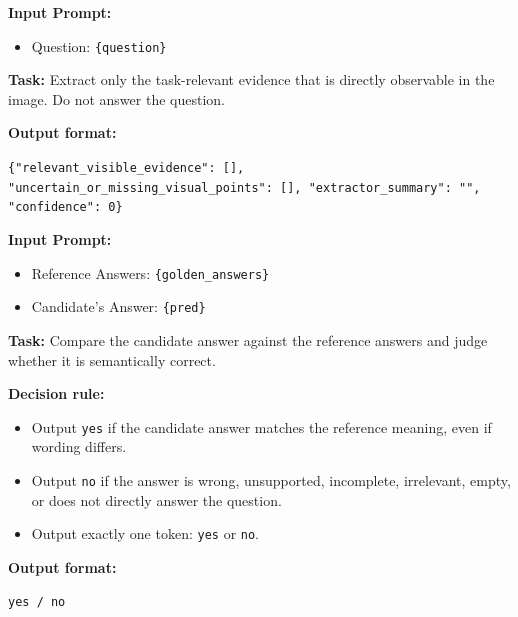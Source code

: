 \documentclass{article} %
\begin{document}
\begin{tcolorbox}[
  title=Example: C2 Stage-1 Visual Evidence Extraction Prompt,
  coltitle=black,
  colbacktitle=blue!8,
  colback=blue!5,
  colframe=black,
  fonttitle=\bfseries,
  arc=2mm,
  boxrule=0.5pt,
  enhanced jigsaw,
  breakable,
  width=\linewidth,
  left=6pt,
  right=6pt,
  top=6pt,
  bottom=6pt
]

\textbf{Input Prompt:}

\begin{itemize}
  \item Question: \texttt{\{question\}}
\end{itemize}

\textbf{Task:}
Extract only the task-relevant evidence that is directly observable in the image.
Do not answer the question.

\textbf{Output format:}

\verb|{"relevant_visible_evidence": [], "uncertain_or_missing_visual_points": [], "extractor_summary": "", "confidence": 0}|
\end{tcolorbox}

\begin{tcolorbox}[
  title=Example: LLM as Judge Prompt,
  coltitle=black,
  colbacktitle=blue!8,
  colback=blue!5,
  colframe=black,
  fonttitle=\bfseries,
  arc=2mm,
  boxrule=0.5pt,
  enhanced jigsaw,
  breakable,
  width=\linewidth,
  left=6pt,
  right=6pt,
  top=6pt,
  bottom=6pt
]

\textbf{Input Prompt:}

\begin{itemize}
  \item Reference Answers: \texttt{\{golden\_answers\}}
  \item Candidate's Answer: \texttt{\{pred\}}
\end{itemize}

\textbf{Task:}
Compare the candidate answer against the reference answers and judge whether it is semantically correct.

\textbf{Decision rule:}
\begin{itemize}
  \item Output \texttt{yes} if the candidate answer matches the reference meaning, even if wording differs.
  \item Output \texttt{no} if the answer is wrong, unsupported, incomplete, irrelevant, empty, or does not directly answer the question.
  \item Output exactly one token: \texttt{yes} or \texttt{no}.
\end{itemize}

\textbf{Output format:}

\verb|yes / no|
\end{tcolorbox}
\end{document}
